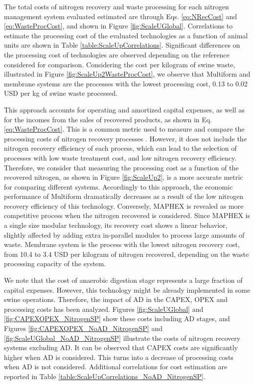 \begin{refsection}[referencesCh6]
The total costs of nitrogen recovery and waste processing for each nitrogen management system evaluated estimated are through Eqs. \ref{eq:NRecCost} and \ref{eq:WasteProcCost}, and shown in Figure \ref{fig:ScaleUGlobal}.
Correlations to estimate the processing cost of the evaluated technologies as a function of animal units are shown in Table \ref{table:ScaleUpCorrelations}. Significant differences on the processing cost of technologies are observed depending on the reference considered for comparison. Considering the cost per kilogram of swine waste, illustrated in Figure \ref{fig:ScaleUp2WasteProcCost}, we observe that Multiform and membrane systems are the processes with the lowest processing cost, 0.13 to 0.02 USD per kg of swine waste processed. 

This approach accounts for operating and amortized capital expenses, as well as for the incomes from the sales of recovered products, as shown in Eq. \ref{eq:WasteProcCost}.
This is a common metric used to measure and compare the processing costs of nitrogen recovery processes \citep{de2019resource, bolzonella2018nutrients}.
However, it does not include the nitrogen recovery efficiency of each process, which can lead to the selection of processes with low waste treatment cost, and low nitrogen recovery efficiency. Therefore, we consider that measuring the processing cost as a function of the recovered nitrogen, as shown in Figure \ref{fig:ScaleUp2}, is a more accurate metric for comparing different systems. Accordingly to this approach, the economic performance of Multiform dramatically decreases as a result of the low nitrogen recovery efficiency of this technology. Conversely, MAPHEX is revealed as more competitive process when the nitrogen recovered is considered. Since MAPHEX is a single size modular technology, its recovery cost shows a linear behavior, slightly affected by adding extra in-parallel modules to process large amounts of waste. Membrane system is the process with the lowest nitrogen recovery cost, from 10.4 to 3.4 USD per kilogram of nitrogen recovered, depending on the waste processing capacity of the system.

We note that the cost of anaerobic digestion stage represents a large fraction of capital expenses. However, this technology might be already implemented in some swine operations. Therefore, the impact of AD in the CAPEX, OPEX and processing costs has been analyzed. Figures \ref{fig:ScaleUGlobal} and
\ref{fig:CAPEXOPEX_NitrogenSP}
show these costs including AD stages, and
Figures \ref{fig:CAPEXOPEX_NoAD_NitrogenSP} and \ref{fig:ScaleUGlobal_NoAD_NitrogenSP}
illustrate the costs of nitrogen recovery systems excluding AD. It can be observed that CAPEX costs are significantly higher when AD is considered. This turns into a decrease of processing costs when AD is not considered. Additional correlations for cost estimation
are reported in
Table \ref{table:ScaleUpCorrelations_NoAD_NitrogenSP}.


\end{refsection}
